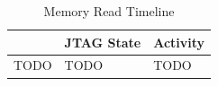 \documentclass{article}
\begin{document}
\begin{table}[htp]
    \centering
    \caption{Memory Read Timeline}
    \label{tab:memread}
    \begin{tabulary}{\textwidth}{|r|l|L|}
        \hline
        & JTAG State & Activity \\
        \hline
        TODO & TODO & TODO \\

\end{tabulary}
\end{table}
\end{document}
